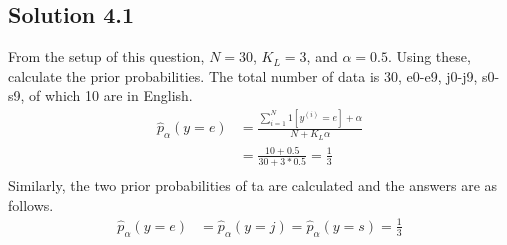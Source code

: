 \documentclass[a4paper]{article}
\theoremstyle{definition}
\newenvironment{soln}{
	\leavevmode\color{blue}\ignorespaces
}{}
\begin{document}
	\subsection*{Solution 4.1}	
	\begin{soln}
	From the setup of this question, $N = 30$, $K_L = 3$, and $\alpha = 0.5$. Using these, calculate the prior probabilities. The total number of data is 30, e0-e9, j0-j9, s0-s9, of which 10 are in English.
		\begin{equation*}\label{xx}
			\begin{split}
				\hat{p}_{\alpha}(y = e) &= \frac{\sum_{i=1}^{N} 1[y^{(i)} = e] + \alpha }{N + K_L \alpha} \\ 
				&= \frac{10 + 0.5}{30 + 3*0.5} = \frac{1}{3}\\
			\end{split}
		\end{equation*}	
		Similarly, the two prior probabilities of ta are calculated and the answers are as follows.
		\begin{equation*}\label{xx}
			\begin{split}
				\hat{p}_{\alpha}(y = e) &= 	\hat{p}_{\alpha}(y = j) = \hat{p}_{\alpha}(y = s) =  \frac{1}{3}\\
			\end{split}
		\end{equation*}	
		
	\end{soln}
	
	\clearpage
\end{document}
